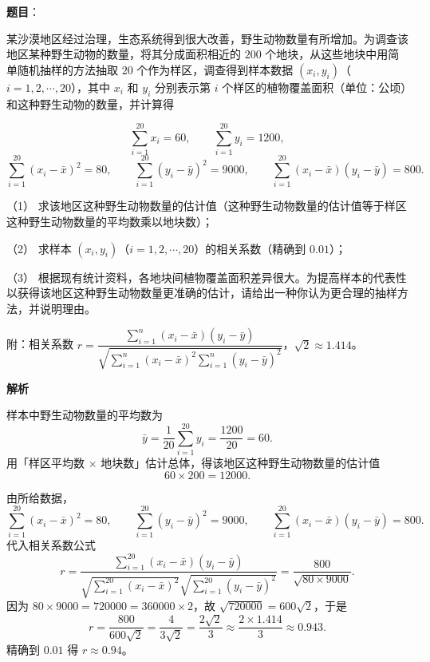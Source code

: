 \begin{answer}

\textbf{题目}：

某沙漠地区经过治理，生态系统得到很大改善，野生动物数量有所增加。为调查该地区某种野生动物的数量，将其分成面积相近的 $200$ 个地块，从这些地块中用简单随机抽样的方法抽取 $20$ 个作为样区，调查得到样本数据 $(x_i,y_i)$（$i=1,2,\cdots,20$），其中 $x_i$ 和 $y_i$ 分别表示第 $i$ 个样区的植物覆盖面积（单位：公顷）和这种野生动物的数量，并计算得

\nopagebreak[4]
\[\sum_{i=1}^{20}x_i=60,\qquad \sum_{i=1}^{20}y_i=1200,\]
\nopagebreak[4]
\[\sum_{i=1}^{20}(x_i-\bar x)^2=80,\qquad \sum_{i=1}^{20}(y_i-\bar y)^2=9000,\qquad \sum_{i=1}^{20}(x_i-\bar x)(y_i-\bar y)=800.\]

（1） 求该地区这种野生动物数量的估计值（这种野生动物数量的估计值等于样区这种野生动物数量的平均数乘以地块数）；

（2） 求样本 $(x_i,y_i)$（$i=1,2,\cdots,20$）的相关系数（精确到 $0.01$）；

（3） 根据现有统计资料，各地块间植物覆盖面积差异很大。为提高样本的代表性以获得该地区这种野生动物数量更准确的估计，请给出一种你认为更合理的抽样方法，并说明理由。

附：相关系数 $r=\dfrac{\sum\limits_{i=1}^n(x_i-\bar x)(y_i-\bar y)}{\sqrt{\sum\limits_{i=1}^n(x_i-\bar x)^2\sum\limits_{i=1}^n(y_i-\bar y)^2}}$，$\sqrt2\approx1.414$。

\textbf{解析}


样本中野生动物数量的平均数为
\nopagebreak[4]
\[\bar y=\frac1{20}\sum_{i=1}^{20}y_i=\frac{1200}{20}=60 .\]
用「样区平均数 $\times$ 地块数」估计总体，得该地区这种野生动物数量的估计值
\nopagebreak[4]
\[60\times200=12000 .\]


由所给数据，
\nopagebreak[4]
\[\sum_{i=1}^{20}(x_i-\bar x)^2=80,\qquad \sum_{i=1}^{20}(y_i-\bar y)^2=9000,\qquad \sum_{i=1}^{20}(x_i-\bar x)(y_i-\bar y)=800 .\]
代入相关系数公式
\nopagebreak[4]
\[r=\frac{\sum\limits_{i=1}^{20}(x_i-\bar x)(y_i-\bar y)}
{\sqrt{\sum\limits_{i=1}^{20}(x_i-\bar x)^2}\sqrt{\sum\limits_{i=1}^{20}(y_i-\bar y)^2}}
=\frac{800}{\sqrt{80\times9000}} .\]
因为 $80\times9000=720000=360000\times2$，故 $\sqrt{720000}=600\sqrt2$，于是
\nopagebreak[4]
\[r=\frac{800}{600\sqrt2}=\frac{4}{3\sqrt2}=\frac{2\sqrt2}3\approx\frac{2\times1.414}3\approx0.943 .\]
精确到 $0.01$ 得 $r\approx0.94$。


\end{answer}
